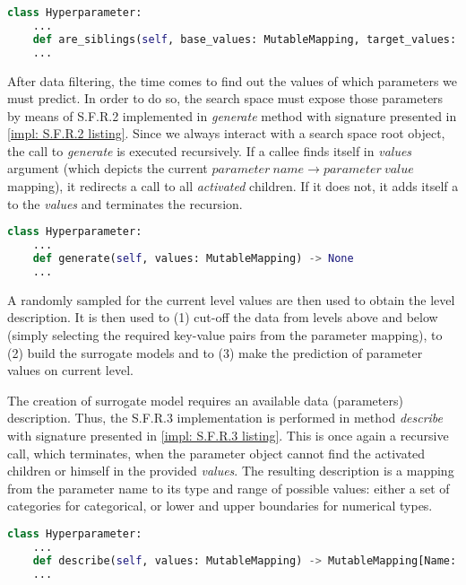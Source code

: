 \begin{lstlisting}[language=Python, caption=S.F.R.1 implementation., label=impl: S.F.R.1 listing]
class Hyperparameter:
	...
    def are_siblings(self, base_values: MutableMapping, target_values: MutableMapping) -> bool
	...
\end{lstlisting}

After data filtering, the time comes to find out the values of which parameters we must predict. In order to do so, the search space must expose those parameters by means of S.F.R.2 implemented in \emph{generate} method with signature presented in \cref{impl: S.F.R.2 listing}. Since we always interact with a search space root object, the call to \emph{generate} is executed recursively. If a callee finds itself in \emph{values} argument (which depicts the current $parameter\ name \rightarrow parameter\ value$ mapping), it redirects a call to all \textit{activated} children. If it does not, it adds itself a to the \emph{values} and terminates the recursion.

\begin{lstlisting}[language=Python, caption=S.F.R.2 implementation., label=impl: S.F.R.2 listing]
class Hyperparameter:
	...
    def generate(self, values: MutableMapping) -> None
	...
\end{lstlisting}

A randomly sampled for the current level values are then used to obtain the level description. It is then used to (1) cut-off the data from levels above and below (simply selecting the required key-value pairs from the parameter mapping), to (2) build the surrogate models and to (3) make the prediction of parameter values on current level.

The creation of surrogate model requires an available data (parameters) description. Thus, the S.F.R.3 implementation is performed in method \emph{describe} with signature presented in \cref{impl: S.F.R.3 listing}. This is once again a recursive call, which terminates, when the parameter object cannot find the activated children or himself in the provided \emph{values}. The resulting description is a mapping from the parameter name to its type and range of possible values: either a set of categories for categorical, or lower and upper boundaries for numerical types.

\begin{lstlisting}[language=Python, caption=S.F.R.3 implementation., label=impl: S.F.R.3 listing]
class Hyperparameter:
	...
    def describe(self, values: MutableMapping) -> MutableMapping[Name: [Type, Values]]
	...
\end{lstlisting}


